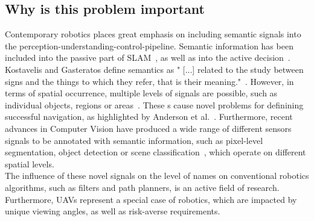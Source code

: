 \documentclass[twocolumn,letterpaper]{IEEEAerospaceCLS}  %
\begin{document}
\subsection{Why is this problem important}
Contemporary robotics places great emphasis on including semantic signals into the perception-understanding-control-pipeline. Semantic information has been included into the passive part of SLAM~\cite{cadena_past_2016,zhang_hierarchical_2019}, as well as into the active decision~\cite{koch_automatic_2019,alirezaie_exploiting_2017}. Kostavelis and Gasteratos define semantics as " [...] related to the study between signs and the things to which they refer, that is their meaning."~\cite{kostavelis_semantic_2015}. However, in terms of spatial occurrence, multiple levels of signals are possible, such as individual objects, regions or areas~\cite{kostavelis_semantic_2015}. These s cause novel problems for definining successful navigation, as highlighted by Anderson et al.~\cite{anderson_evaluation_2018}. Furthermore, recent advances in Computer Vision have produced a wide range of different sensors signals to be annotated with semantic information, such as pixel-level segmentation, object detection or scene classification~\cite{alom_history_2018}, which operate on different spatial levels.\\
The influence of these novel signals on the level of names on conventional robotics algorithms, such as filters and path planners, is an active field of research. Furthermore, UAVs represent a special case of robotics, which are impacted by unique viewing angles, as well as risk-averse requirements.
\end{document}
